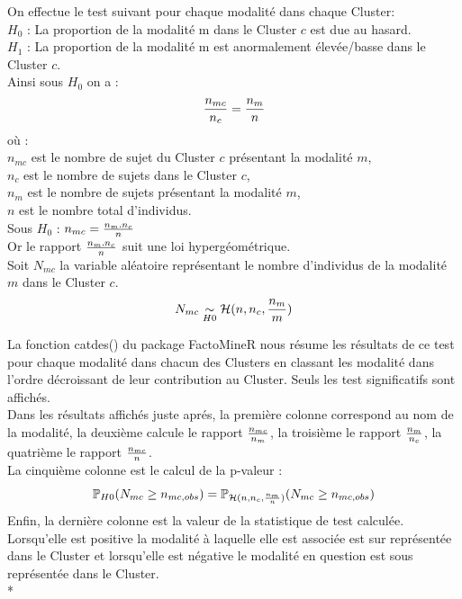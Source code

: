 \documentclass{book}
\begin{document}
\noindent
On effectue le test suivant pour chaque modalité dans chaque Cluster:\\
\noindent 
$H_0$ : La proportion de la modalité m dans le Cluster $c$ est due au hasard.\\
\noindent
$H_1$ : La proportion de la modalité m est anormalement élevée/basse dans le Cluster $c$.\\

\noindent
Ainsi sous $H_0$ on a : \\
\begin{equation}
{{n_{mc}} \over {n_c}} = {{n_m} \over {n}}
\end{equation} 
où :\\
$n_{mc}$ est le nombre de sujet du Cluster $c$ présentant la modalité $m$,\\
$n_c$ est le nombre de sujets dans le Cluster $c$,\\
$n_m$ est le nombre de sujets présentant la modalité $m$,\\
$n$ est le nombre total d'individus.\\
	
\noindent
Sous $H_0$ : $n_{mc}  = {n_m . n_c \over {n}} $\\
Or le rapport ${n_m . n_c \over {n}} $ suit une loi hypergéométrique.\\
Soit $N_{mc}$ la variable aléatoire représentant le nombre d'individus de la modalité $m$ dans le Cluster $c$.
\begin{equation}
 N_{mc} \underset{H0}{\sim} \mathcal{H}(n, n_c, {{n_m}\over {m}})
\end{equation}

\noindent
La fonction catdes() du package FactoMineR nous résume les résultats de ce test pour chaque modalité dans chacun des Clusters en classant les modalité dans l'ordre décroissant de leur contribution au Cluster.
Seuls les test significatifs sont affichés.\\

\noindent
Dans les résultats affichés juste aprés, la première colonne correspond au nom de la modalité, la deuxième calcule le rapport $n_{mc} \over n_m$, la troisième le rapport $n_m \over n_c$, la quatrième le rapport $n_{mc} \over n$.\\
La cinquième colonne est le calcul de la p-valeur :\\
\begin{equation}
\mathbb{P}_{H0}(N_{mc} \geq n_{mc, obs}) =  \mathbb{P}_{\mathcal{H}(n, n_c, {n_m \over n})}(N_{mc} \geq n_{mc, obs})
\end{equation} 
Enfin, la dernière colonne est la valeur de la statistique de test calculée. Lorsqu'elle est positive la modalité à laquelle elle est associée est sur représentée dans le Cluster et lorsqu'elle est négative le modalité en question est sous représentée dans le Cluster.\\*
\end{document}
